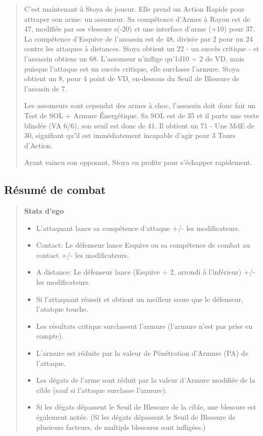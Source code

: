 \begin{quotation}
C'est maintenant à Stoya de joueur. Elle prend un Action Rapide pour attraper son arme: un assomeur. Sa compétence d'Armes à Rayon est de 47, modifiée par ses vlessure s(-20) et une interface d'arme (+10) pour 37. La compétence d'Esquive de l'assassin est de 48, divisée par 2 pour un 24 contre les attaques à distances. Stoya obtient un 22 - un succès critique - et l'assassin obtiens un 68. L'assomeur n'inflige qu'1d10 $\div$ 2 de VD, mais puisque l'attaque est un succès critique, elle surclasse l'armure. Stoya obtient un 8, pour 4 point de VD, en-dessous du Seuil de Blessure de l'assasin de 7. 

Les assomeurs sont cependat des armes à choc, l'assassin doit donc fair un Test de SOL + Armure Énergétique. Sa SOL est de 35 et il porte une veste blindée (VA 6/6), son seuil est donc de 41. Il obtient un 71 - Une MdE de 30, signifiant qu'il est immédiatement incapable d'agir pour 3 Tours d'Action. 

Ayant vaincu son opposant, Stoya en profite pour s'échapper rapidement. \end{quotation} 



\subsection{Résumé de combat} 

\begin{quotation} \textbf{Stats d'ego} \begin{itemize} \item L'attaquant lance sa compétence d'attaque +/- les modificateurs. \item Contact: Le défenseur lance Esquive ou sa compétence de combat au contact +/- les modificateurs. \item A distance: Le défenseur lance (Esquive $\div$ 2, arrondi à l'inférieur) +/- les modificateurs. \item Si l'attaquant réussit et obtient un meilleur score que le défenseur, l'atatque touche. \item Les résultats critique surclassent l'armure (l'armure n'est pas prise en compte). \item L'armure est réduite par la valeur de Pénétration d'Armure (PA) de l'attaque. \item Les dégats de l'arme sont réduit par la valeur d'Armure modifiée de la cible (sauf si l'attaque surclasse l'armure). \item Si les dégats dépassent le Seuil de Blessure de la cible, une blessure est également notée. (Si les dégats dépassent le Seuil de Blessure de plusieurs facteurs, de multipls blessures sont infligées.) \end{itemize} \end{quotation} 

